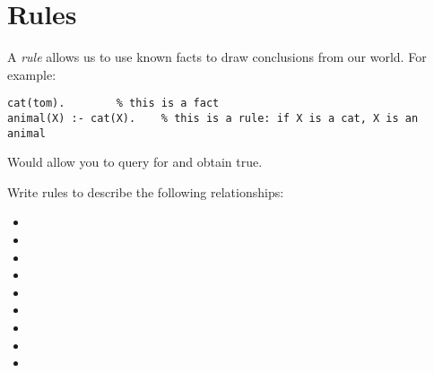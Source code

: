 \documentclass{../../../tp}
\begin{document}
\section{Rules}

A \emph{rule} allows us to use known facts to draw conclusions from our world. For example:

\begin{verbatim}
cat(tom). 		 % this is a fact
animal(X) :- cat(X).	% this is a rule: if X is a cat, X is an animal
\end{verbatim}

Would allow you to query for  and obtain true.


\begin{instruction}
	Write rules to describe the following relationships:
	\begin{itemize}
	 \item {}
	 \item {}
	 \item {}
	 \item {}
	 \item {}
	 \item {}
	 \item {}
	 \item {}
	 \item {}
	\end{itemize}
\end{instruction}
\end{document}
